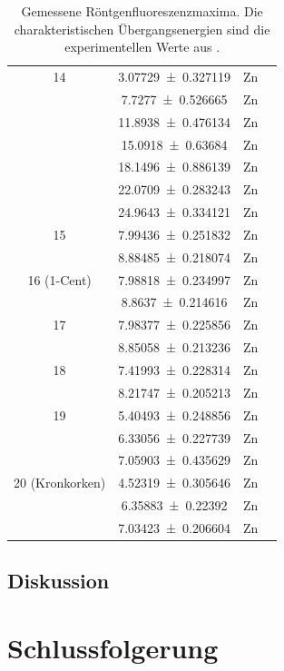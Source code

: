 \documentclass[
	a4paper,
	12pt,
	pagesize,
	ngerman
]{scrartcl}
\begin{document}
\begin{table}[H]
\begin{tabular}{ c | c || c | c }
			14 & \SI{3.07729+-0.327119}{} &Zn &  \SI{}{} \\
			& \SI{7.7277+-0.526665}{} &Zn &  \SI{}{} \\
			& \SI{11.8938+-0.476134}{} &Zn &  \SI{}{} \\
			& \SI{15.0918+-0.63684}{} &Zn &  \SI{}{} \\
			& \SI{18.1496+-0.886139}{} &Zn &  \SI{}{} \\
			& \SI{22.0709+-0.283243}{} &Zn &  \SI{}{} \\
			& \SI{24.9643+-0.334121}{} &Zn &  \SI{}{} \\ \hline
			
			15 & \SI{7.99436+-0.251832}{} &Zn &  \SI{}{} \\
			& \SI{8.88485+-0.218074}{} &Zn &  \SI{}{} \\ \hline
			
			16 (1-Cent)& \SI{7.98818+-0.234997}{} &Zn &  \SI{}{} \\
			& \SI{8.8637+-0.214616}{} &Zn &  \SI{}{} \\ \hline
			
			17 & \SI{7.98377+-0.225856}{} &Zn &  \SI{}{} \\
			& \SI{8.85058+-0.213236}{} &Zn &  \SI{}{} \\ \hline
			
			18 & \SI{7.41993+-0.228314}{} &Zn &  \SI{}{} \\
			& \SI{8.21747+-0.205213}{} &Zn &  \SI{}{} \\ \hline
			
			19 & \SI{5.40493+-0.248856}{} &Zn &  \SI{}{} \\
			& \SI{6.33056+-0.227739}{} &Zn &  \SI{}{} \\
			& \SI{7.05903+-0.435629}{} &Zn &  \SI{}{} \\ \hline
			
			20 (Kronkorken) & \SI{4.52319+-0.305646}{} &Zn &  \SI{}{} \\
			& \SI{6.35883+-0.22392}{} &Zn &  \SI{}{} \\
			& \SI{7.03423+-0.206604}{} &Zn &  \SI{}{} \\ \hline
		\end{tabular}
		\caption{Gemessene Röntgenfluoreszenzmaxima. Die charakteristischen Übergangsenergien sind die experimentellen Werte aus \cite{XRAYDB}.}
		\label{tb_peaks_unknown} 
	\end{table}
	
	\subsection{Diskussion}
	
	\section{Schlussfolgerung}
	
	\printbibliography
\end{document}
